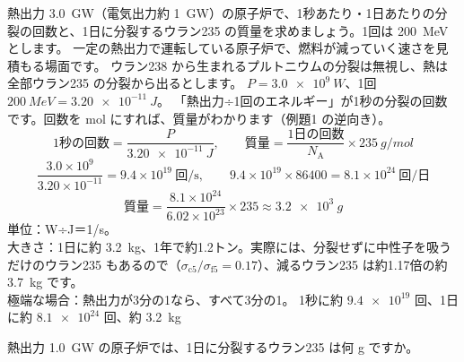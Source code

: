 \label{ph:原-15:ex2}
\begin{phreidai}
熱出力 \qty{3.0}{GW}（電気出力約 \qty{1}{GW}）の原子炉で、1秒あたり・1日あたりの分裂の回数と、1日に分裂するウラン235 の質量を求めましょう。1回は \qty{200}{MeV} とします。
\phbamen
一定の熱出力で運転している原子炉で、燃料が減っていく速さを見積もる場面です。
\phmushi
ウラン238 から生まれるプルトニウムの分裂は無視し、熱は全部ウラン235 の分裂から出るとします。
\phzu
$P=\qty{3.0e9}{W}$、1回 $\qty{200}{MeV}=\qty{3.20e-11}{J}$。
\phriyu
「熱出力÷1回のエネルギー」が1秒の分裂の回数です。回数を mol にすれば、質量がわかります（例題1 の逆向き）。
\phtateru
\[ \text{1秒の回数}=\frac{P}{\qty{3.20e-11}{J}},\qquad \text{質量}=\frac{\text{1日の回数}}{N_{\mathrm A}}\times\qty{235}{g/mol} \]
\phtoku
\[ \frac{3.0\times10^9}{3.20\times10^{-11}}=9.4\times10^{19}\ \text{回/s},\qquad 9.4\times10^{19}\times\num{86400}=8.1\times10^{24}\ \text{回/日} \]
\[ \text{質量}=\frac{8.1\times10^{24}}{6.02\times10^{23}}\times235\approx\qty{3.2e3}{g} \]
\phtashikame
単位：W÷J＝1/s。\\
大きさ：1日に約 \qty{3.2}{kg}、1年で約1.2トン。実際には、分裂せずに中性子を吸うだけのウラン235 もあるので（$\sigma_{\mathrm c5}/\sigma_{\mathrm f5}=0.17$）、減るウラン235 は約1.17倍の約 \qty{3.7}{kg} です。\\
極端な場合：熱出力が3分の1なら、すべて3分の1。
\kotae 1秒に約 $\num{9.4e19}$ 回、1日に約 $\num{8.1e24}$ 回、約 \qty{3.2}{kg}
\end{phreidai}
\begin{jibun}
熱出力 \qty{1.0}{GW} の原子炉では、1日に分裂するウラン235 は何 g ですか。
\end{jibun}

